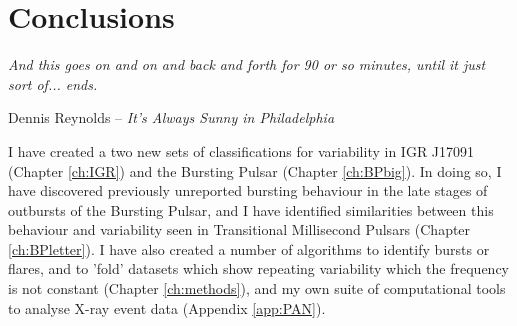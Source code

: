 \chapter{Conclusions}

\epigraph{\textit{And this goes on and on and back and forth for 90 or so minutes, until it just sort of... ends.}}{Dennis Reynolds -- \textit{It's Always Sunny in Philadelphia}}

\vspace{1cm}

\par\noindent I have created a two new sets of classifications for variability in IGR J17091 (Chapter \ref{ch:IGR}) and the Bursting Pulsar (Chapter \ref{ch:BPbig}).  In doing so, I have discovered previously unreported bursting behaviour in the late stages of outbursts of the Bursting Pulsar, and I have identified similarities between this behaviour and variability seen in Transitional Millisecond Pulsars (Chapter \ref{ch:BPletter}).  I have also created a number of algorithms to identify bursts or flares, and to 'fold' datasets which show repeating variability which the frequency is not constant (Chapter \ref{ch:methods}), and my own suite of computational tools to analyse X-ray event data (Appendix \ref{app:PAN}).
